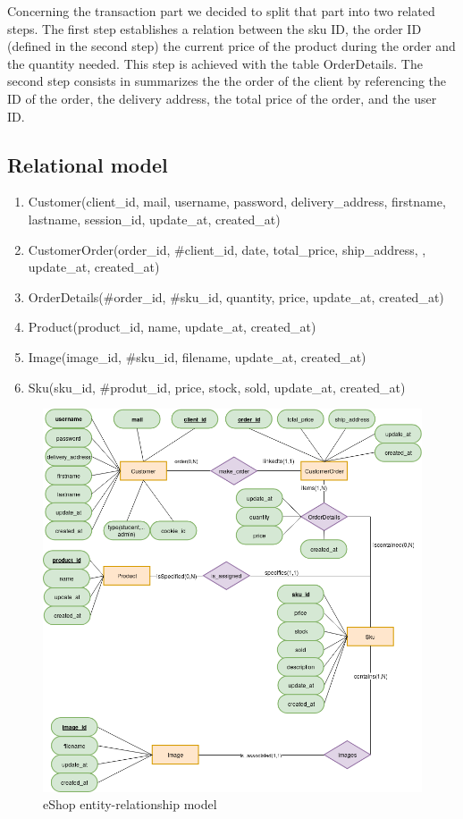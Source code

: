 \documentclass{article}
\begin{document}
Concerning the transaction part we decided to split that part into two related steps. The first step establishes a relation between the sku ID, the order ID (defined in the second step) the  current price of the product during the order and the quantity needed. This step is achieved with the table OrderDetails. The second step consists in summarizes the the order of the client by referencing the ID of the order, the delivery address, the total price of the order, and  the user ID.

\subsection{Relational model}
\begin{enumerate}
\item Customer(client\_id, mail, username, password, delivery\_address, firstname, lastname, session\_id, update\_at, created\_at)
\item CustomerOrder(order\_id, \#client\_id, date, total\_price, ship\_address, , update\_at, created\_at)
\item OrderDetails(\#order\_id, \#sku\_id, quantity, price, update\_at, created\_at)
\item Product(product\_id, name, update\_at, created\_at)
\item Image(image\_id, \#sku\_id, filename, update\_at, created\_at)
\item Sku(sku\_id, \#produt\_id, price, stock, sold, update\_at, created\_at)
\end{enumerate}

\begin{figure}[h!]
    \centering
    \includegraphics[scale=0.4]{./images/ecommercev2_er.png}
    \caption{eShop entity-relationship model}
    \label{ecommerce_er}
\end{figure}
\end{document}
